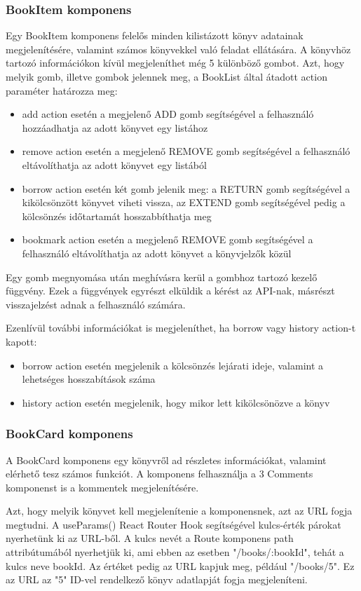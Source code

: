 \subsubsection{BookItem komponens}
Egy BookItem komponens felelős minden kilistázott könyv adatainak megjelenítésére, valamint számos könyvekkel való feladat ellátására. A könyvhöz tartozó információkon kívül megjeleníthet még 5 különböző gombot. Azt, hogy melyik gomb, illetve gombok jelennek meg, a BookList által átadott action paraméter határozza meg:
\begin{itemize}
    \item add action esetén a megjelenő ADD gomb segítségével a felhasználó hozzáadhatja az adott könyvet egy listához
    \item remove action esetén a megjelenő REMOVE gomb segítségével a felhasználó eltávolíthatja az adott könyvet egy listából
    \item borrow action esetén két gomb jelenik meg: a RETURN gomb segítségével a kikölcsönzött könyvet viheti vissza, az EXTEND gomb segítségével pedig a kölcsönzés időtartamát hosszabbíthatja meg
    \item bookmark action esetén a megjelenő REMOVE gomb segítségével a felhasználó eltávolíthatja az adott könyvet a könyvjelzők közül
\end{itemize}
Egy gomb megnyomása után meghívásra kerül a gombhoz tartozó kezelő függvény. Ezek a függvények egyrészt elküldik a kérést az API-nak, másrészt visszajelzést adnak a felhasználó számára.

Ezenlívül további információkat is megjeleníthet, ha borrow vagy history action-t kapott:
\begin{itemize}
    \item borrow action esetén megjelenik a kölcsönzés lejárati ideje, valamint a lehetséges hosszabítások száma
    \item history action esetén megjelenik, hogy mikor lett kikölcsönözve a könyv
\end{itemize}

\subsubsection{BookCard komponens}
A BookCard komponens egy könyvről ad részletes információkat, valamint elérhető tesz számos funkciót. A komponens felhasználja a 3 Comments komponenst is a kommentek megjelenítésére.

\bigskip

Azt, hogy melyik könyvet kell megjelenítenie a komponensnek, azt az URL fogja megtudni. A useParams() React Router Hook segítségével kulcs-érték párokat nyerhetünk ki az URL-ből. A kulcs nevét a Route komponens path attribútumából nyerhetjük ki, ami ebben az esetben "/books/:bookId", tehát a kulcs neve bookId. Az értéket pedig az URL kapjuk meg, például "/books/5". Ez az URL az "5" ID-vel rendelkező könyv adatlapját fogja megjeleníteni.

